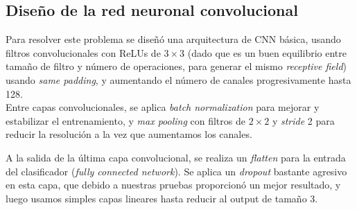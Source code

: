 \subsection{Diseño de la red neuronal convolucional}
Para resolver este problema se diseñó una arquitectura de CNN básica, usando filtros convolucionales con ReLUs de $3\times 3$ (dado que es un buen equilibrio entre tamaño de filtro y número de operaciones, para generar el mismo \textit{receptive field}) usando \textit{same padding}, y aumentando el número de canales progresivamente hasta 128.\\
Entre capas convolucionales, se aplica \textit{batch normalization} para mejorar y estabilizar el entrenamiento, y \textit{max pooling} con filtros de $2\times 2$ y \textit{stride} 2 para reducir la resolución a la vez que aumentamos los canales.\smallskip

A la salida de la última capa convolucional, se realiza un \textit{flatten} para la entrada del clasificador (\textit{fully connected network}). Se aplica un \textit{dropout} bastante agresivo en esta capa, que debido a nuestras pruebas proporcionó un mejor resultado, y luego usamos simples capas lineares hasta reducir al output de tamaño 3.

